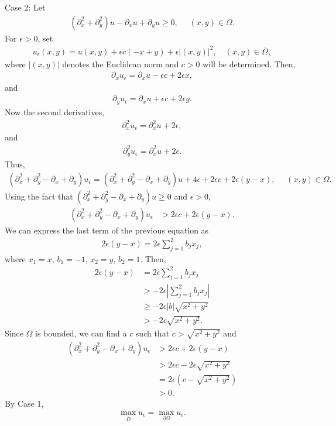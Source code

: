 \begin{questions}
\begin{solution}
Case 2: Let
\begin{align*}
(\partial_x^2+\partial_y^2)u-\partial_xu+\partial_yu\geq 0,~~~~~~(x,y)\in\Omega.
\end{align*}
For $\epsilon>0$, set
\begin{align*}
u_{\epsilon}(x,y)=u(x,y)+\epsilon c(-x+y)+\epsilon |(x,y)|^2,\quad (x,y)\in\overline{\Omega},
\end{align*}
where $|(x,y)|$ denotes the Euclidean norm and $c > 0$ will be determined. Then,
\begin{align*}
\partial_xu_{\epsilon}=\partial_xu-\epsilon c+2\epsilon x,
\end{align*}
and
\begin{align*}
\partial_yu_{\epsilon}=\partial_xu+\epsilon c+2\epsilon y.
\end{align*}
Now the second derivatives,
\begin{align*}
\partial^2_xu_{\epsilon}=\partial^2_xu+2\epsilon,
\end{align*}
and
\begin{align*}
\partial^2_yu_{\epsilon}=\partial^2_xu+2\epsilon.
\end{align*}
Thus,
\begin{align*}
(\partial_x^2+\partial_y^2-\partial_x+\partial_y)u_{\epsilon}=(\partial_x^2+\partial_y^2-\partial_x+\partial_y)u+4\epsilon+2\epsilon c+2\epsilon(y-x),~~~~~~(x,y)\in\Omega.
\end{align*}
Using the fact that $(\partial_x^2+\partial_y^2-\partial_x+\partial_y)u\geq 0$ and $\epsilon>0$,
\begin{align*}
(\partial_x^2+\partial_y^2-\partial_x+\partial_y)u_{\epsilon}&>2\epsilon c+2\epsilon(y-x).
\end{align*}
We can express the last term of the previous equation as
\begin{align*}
2\epsilon(y-x)=2\epsilon\sum_{j=1}^2b_jx_j,
\end{align*}
where $x_1=x$, $b_1=-1$, $x_2=y$, $b_2=1$. Then,
\begin{align*}
2\epsilon(y-x)&=2\epsilon\sum_{j=1}^2b_jx_j\\
&>-2\epsilon\left|\sum_{j=1}^2b_jx_j\right|\\
&\geq -2\epsilon\left|b\right|\sqrt{x^2+y^2}\\
&> -2\epsilon\sqrt{x^2+y^2}.
\end{align*}
Since $\Omega$ is bounded, we can find a $c$ such that $c>\sqrt{x^2+y^2}$ and
\begin{align*}
(\partial_x^2+\partial_y^2-\partial_x+\partial_y)u_{\epsilon}&>2\epsilon c+2\epsilon(y-x)\\
&>2\epsilon c-2\epsilon\sqrt{x^2+y^2}\\
&=2\epsilon \left(c-\sqrt{x^2+y^2}\right)\\
&>0.
\end{align*}
By Case 1, 
\begin{align*}
\max_{\overline{\Omega}}u_\epsilon=\max_{\partial\Omega}u_\epsilon.
\end{align*}

\end{solution}
\end{questions}